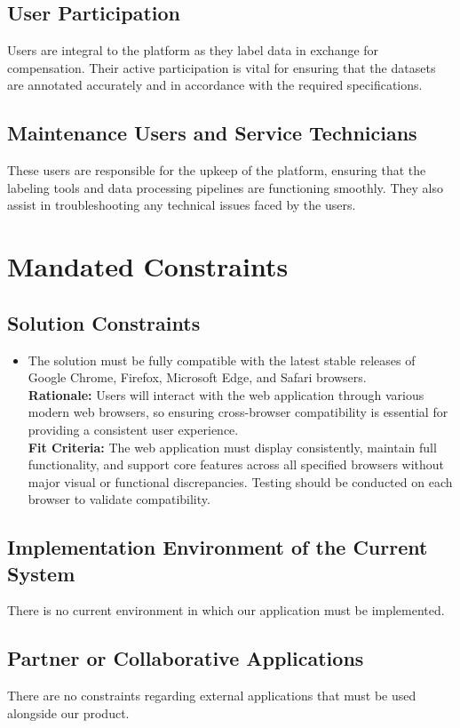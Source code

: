 \documentclass[12pt]{article}
\begin{document}
\subsection{User Participation}
Users are integral to the platform as they label data in exchange for compensation. Their active participation is vital for ensuring that the datasets are annotated accurately and in accordance with the required specifications.

\subsection{Maintenance Users and Service Technicians}
These users are responsible for the upkeep of the platform, ensuring that the labeling tools and data processing pipelines are functioning smoothly. They also assist in troubleshooting any technical issues faced by the users.

\newpage
\section{Mandated Constraints}
\subsection{Solution Constraints}
\begin{itemize}
  \item The solution must be fully compatible with the latest stable releases of Google Chrome, Firefox, Microsoft Edge, and Safari browsers.\\ \textbf{Rationale:} Users will interact with the web application through various modern web browsers, so ensuring cross-browser compatibility is essential for providing a consistent user experience. \\ \textbf{Fit Criteria:} The web application must display consistently, maintain full functionality, and support core features across all specified browsers without major visual or functional discrepancies. Testing should be conducted on each browser to validate compatibility.
\end{itemize}
\subsection{Implementation Environment of the Current System}
There is no current environment in which our application must be implemented.
\subsection{Partner or Collaborative Applications}
There are no constraints regarding external applications that must be used alongside our product.
\end{document}
